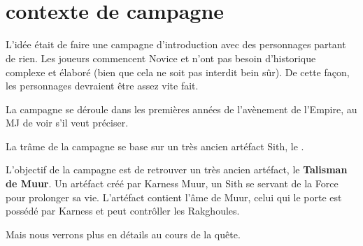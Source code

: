 \documentclass{jdrp}
\begin{document}
	\begin{titlepage}

	\begin{center}
		\hspace*{\vfill}
		\noindent\Huge{}\\ 
		\noindent\fontsize{50}{70}\jedifont{\$}
		\noindent\fontsize{50}{70}\jedifont{\#}\\
		\noindent\fontsize{50}{60}
		\hspace*{\vfill}
	\end{center}

	\hspace*{\vfill}

	\noindent{}

	\end{titlepage}

	\onecolumn
	\section{contexte de campagne}

	L'idée était de faire une campagne d'introduction avec des personnages partant de rien. Les joueurs commencent Novice et n'ont pas besoin d'historique complexe et élaboré (bien que cela ne soit pas interdit bein sûr). De cette façon, les personnages devraient être assez vite fait.

	La campagne se déroule dans les premières années de l'avènement de l'Empire, au MJ de voir s'il veut préciser.

	La trâme de la campagne se base sur un très ancien artéfact Sith, le . 
	
	L'objectif de la campagne est de retrouver un très ancien artéfact, le \textbf{Talisman de Muur}. Un artéfact créé par Karness Muur, un Sith se servant de la Force pour prolonger sa vie. L'artéfact contient l'âme de Muur, celui qui le porte est possédé par Karness et peut contrôller les Rakghoules.

	Mais nous verrons plus en détails au cours de la quête.
	\twocolumn

	

	\onecolumn
	\nocite{*}
	\printbibliography
\end{document}
